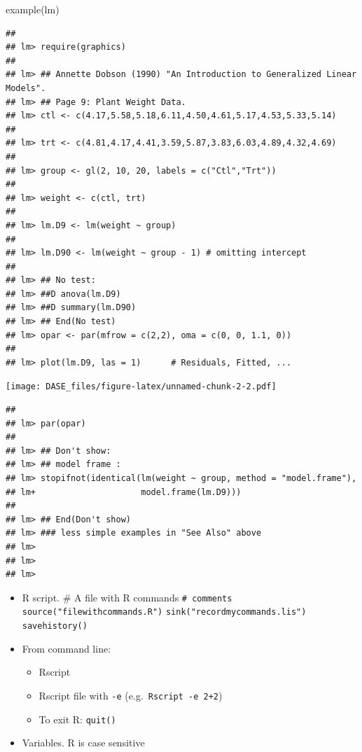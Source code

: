 \documentclass[
]{book}
\newenvironment{Shaded}{\begin{snugshade}}{\end{snugshade}}
\newcommand{\FunctionTok}[1]{\textcolor[rgb]{0.00,0.00,0.00}{#1}}
\newcommand{\NormalTok}[1]{#1}
\providecommand{\tightlist}{%
  \setlength{\itemsep}{0pt}\setlength{\parskip}{0pt}}
\begin{document}
\begin{Shaded}
\begin{Highlighting}[]
\FunctionTok{example}\NormalTok{(lm)}
\end{Highlighting}
\end{Shaded}

\begin{verbatim}
## 
## lm> require(graphics)
## 
## lm> ## Annette Dobson (1990) "An Introduction to Generalized Linear Models".
## lm> ## Page 9: Plant Weight Data.
## lm> ctl <- c(4.17,5.58,5.18,6.11,4.50,4.61,5.17,4.53,5.33,5.14)
## 
## lm> trt <- c(4.81,4.17,4.41,3.59,5.87,3.83,6.03,4.89,4.32,4.69)
## 
## lm> group <- gl(2, 10, 20, labels = c("Ctl","Trt"))
## 
## lm> weight <- c(ctl, trt)
## 
## lm> lm.D9 <- lm(weight ~ group)
## 
## lm> lm.D90 <- lm(weight ~ group - 1) # omitting intercept
## 
## lm> ## No test: 
## lm> ##D anova(lm.D9)
## lm> ##D summary(lm.D90)
## lm> ## End(No test)
## lm> opar <- par(mfrow = c(2,2), oma = c(0, 0, 1.1, 0))
## 
## lm> plot(lm.D9, las = 1)      # Residuals, Fitted, ...
\end{verbatim}

\texttt{[image: DASE\_files/figure-latex/unnamed-chunk-2-2.pdf]}

\begin{verbatim}
## 
## lm> par(opar)
## 
## lm> ## Don't show: 
## lm> ## model frame :
## lm> stopifnot(identical(lm(weight ~ group, method = "model.frame"),
## lm+                     model.frame(lm.D9)))
## 
## lm> ## End(Don't show)
## lm> ### less simple examples in "See Also" above
## lm> 
## lm> 
## lm>
\end{verbatim}

\begin{itemize}
\item
  R script. \# A file with R commands \texttt{\#\ comments} \texttt{source("filewithcommands.R")} \texttt{sink("recordmycommands.lis")} \texttt{savehistory()}
\item
  From command line:

  \begin{itemize}
  \tightlist
  \item
    Rscript\\
  \item
    Rscript file with \texttt{-e} (e.g.~\texttt{Rscript\ -e\ 2+2})\\
  \item
    To exit R: \texttt{quit()}
  \end{itemize}
\item
  Variables. R is case sensitive
\end{itemize}
\end{document}
